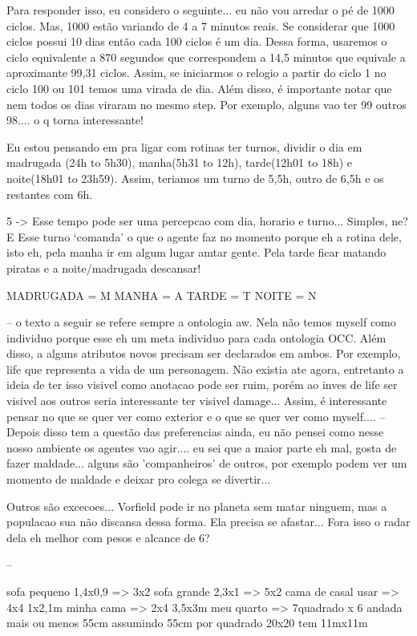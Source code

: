 Para responder isso, eu considero o seguinte... eu não vou arredar o
pé de 1000 ciclos. Mas, 1000 estão variando de 4 a 7 minutos reais.
Se considerar que 1000 ciclos possui 10 dias então cada 100 ciclos é um dia.
Dessa forma, usaremos o ciclo equivalente a 870 segundos que correspondem
a 14,5 minutos que equivale a aproximante 99,31 ciclos. Assim, se iniciarmos
o relogio a partir do ciclo 1 no ciclo 100 ou 101 temos uma virada de dia.
Além disso, é importante notar que nem todos os dias viraram no mesmo step.
Por exemplo, alguns vao ter 99 outros 98.... o q torna interessante!

Eu estou pensando em pra ligar com rotinas ter turnos, dividir o dia em
madrugada (24h to 5h30), manha(5h31 to 12h), tarde(12h01 to 18h) e
noite(18h01 to 23h59). Assim, teriamos um turno de 5,5h, outro de 6,5h e os
restantes com 6h.

5 -> Esse tempo pode ser uma percepcao com dia, horario e turno... Simples,
ne?
       E Esse turno `comanda' o que o agente faz no momento porque eh a rotina
       dele, isto eh, pela manha ir em algum lugar amtar gente. Pela tarde
ficar
       matando piratas e a noite/madrugada descansar!

MADRUGADA = M
MANHA = A
TARDE = T
NOITE = N

--
o texto a seguir se refere sempre a ontologia aw.
Nela não temos myself como individuo porque esse
eh um meta individuo para cada ontologia OCC.
Além disso, a alguns atributos novos precisam ser
declarados em ambos. Por exemplo, life que representa
a vida de um personagem. Não existia ate agora,
entretanto a ideia de ter isso visivel como anotacao
pode ser ruim, porém ao inves de life ser visivel aos
outros seria interessante ter visivel damage...
Assim, é interessante pensar no que se quer ver
como exterior e o que se quer ver como myself....
--
Depois disso tem a questão das preferencias ainda,
eu não pensei como nesse nosso ambiente os agentes
vao agir.... eu sei que a maior parte eh mal, gosta de
fazer maldade... alguns são 'companheiros' de outros,
por exemplo podem ver um momento de maldade e
deixar pro colega se divertir...

Outros são excecoes... Vorfield pode ir no planeta
sem matar ninguem, mas a populacao sua não discansa
dessa forma. Ela precisa se afastar... Fora isso o radar dela
 eh melhor com pesos e alcance de 6?

--

sofa pequeno 1,4x0,9 => 3x2
sofa grande 2,3x1 => 5x2
cama de casal usar => 4x4
1x2,1m minha cama => 2x4
3,5x3m meu quarto => 7quadrado x 6
andada mais ou menos 55cm
assumindo 55cm por quadrado
20x20 tem 11mx11m

